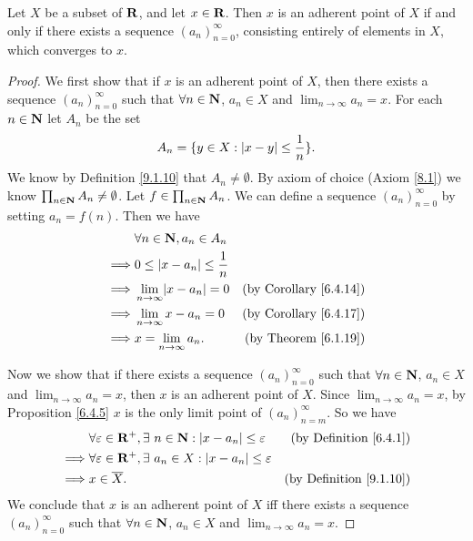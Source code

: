\begin{lemma}\label{9.1.14}
    Let \(X\) be a subset of \(\mathbf{R}\), and let \(x \in \mathbf{R}\).
    Then \(x\) is an adherent point of \(X\) if and only if there exists a sequence \((a_n)_{n = 0}^\infty\), consisting entirely of elements in \(X\), which converges to \(x\).
\end{lemma}

\begin{proof}
    We first show that if \(x\) is an adherent point of \(X\), then there exists a sequence \((a_n)_{n = 0}^\infty\) such that \(\forall n \in \mathbf{N}\), \(a_n \in X\) and \(\lim_{n \to \infty} a_n = x\).
    For each \(n \in \mathbf{N}\) let \(A_n\) be the set
    \[
        A_n = \{y \in X : \left\lvert x - y\right\rvert \leq \frac{1}{n}\}.
    \]
    We know by Definition \ref{9.1.10} that \(A_n \neq \emptyset\).
    By axiom of choice (Axiom \ref{8.1}) we know \(\prod_{n \in \mathbf{N}} A_n \neq \emptyset\).
    Let \(f \in \prod_{n \in \mathbf{N}} A_n\).
    We can define a sequence \((a_n)_{n = 0}^\infty\) by setting \(a_n = f(n)\).
    Then we have
    \begin{align*}
                 & \forall n \in \N, a_n \in A_n                                              \\
        \implies & 0 \leq \abs{x - a_n} \leq \frac{1}{n}                                      \\
        \implies & \lim_{n \to \infty} \abs{x - a_n} = 0 & \text{(by Corollary \ref{6.4.14})} \\
        \implies & \lim_{n \to \infty} x - a_n = 0       & \text{(by Corollary \ref{6.4.17})} \\
        \implies & x = \lim_{n \to \infty} a_n.          & \text{(by Theorem \ref{6.1.19})}
    \end{align*}

    Now we show that if there exists a sequence \((a_n)_{n = 0}^\infty\) such that \(\forall n \in \mathbf{N}\), \(a_n \in X\) and \(\lim_{n \to \infty} a_n = x\), then \(x\) is an adherent point of \(X\).
    Since \(\lim_{n \to \infty} a_n = x\), by Proposition \ref{6.4.5} \(x\) is the only limit point of \((a_n)_{n = m}^\infty\).
    So we have
    \begin{align*}
                 & \forall \varepsilon \in \mathbf{R}^+, \exists\ n \in \mathbf{N} : \left\lvert x - a_n\right\rvert \leq \varepsilon  & \text{(by Definition \ref{6.4.1})}  \\
        \implies & \forall \varepsilon \in \mathbf{R}^+, \exists\ a_n \in X : \left\lvert x - a_n\right\rvert \leq \varepsilon                                       \\
        \implies & x \in \overline{X}.                                                               & \text{(by Definition \ref{9.1.10})}
    \end{align*}
    We conclude that \(x\) is an adherent point of \(X\) iff there exists a sequence \((a_n)_{n = 0}^\infty\) such that \(\forall n \in \mathbf{N}\), \(a_n \in X\) and \(\lim_{n \to \infty} a_n = x\).
\end{proof}

